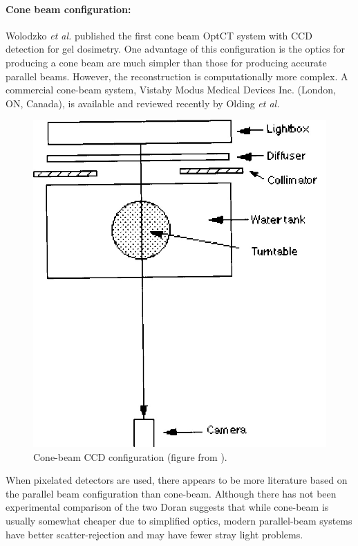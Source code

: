 \documentclass[12pt]{article}
\begin{document}
\paragraph{Cone beam configuration:}
Wolodzko \textit{et al.} published the first cone beam OptCT system with CCD detection for gel dosimetry.\cite{Wolodzko:1999} One advantage of this configuration is the optics for producing a cone beam are much simpler than those for producing accurate parallel beams. \cite{Doran:2008kh} However, the reconstruction is computationally more complex. \cite{hsieh2003computed} A commercial cone-beam system, Vista\texttrademark by Modus Medical Devices Inc. (London, ON, Canada),  is available and reviewed recently by Olding \textit{et al.} \cite{Olding:2011eta}


\begin{figure}[H]
\centering
\includegraphics[scale=0.3]{Wolodzko_1999_conesetup.jpg}
\caption{Cone-beam CCD configuration (figure from \cite{Wolodzko:1999}).}
\end{figure}

When pixelated detectors are used, there appears to be more literature based on the parallel beam configuration than cone-beam. Although there has not been experimental comparison of the two Doran suggests that while cone-beam is usually somewhat cheaper due to simplified optics, modern parallel-beam systems have better scatter-rejection and may have fewer stray light problems. \cite{Doran:2008kh, Olding:2011eta, Thomas:2011eja}
\end{document}
